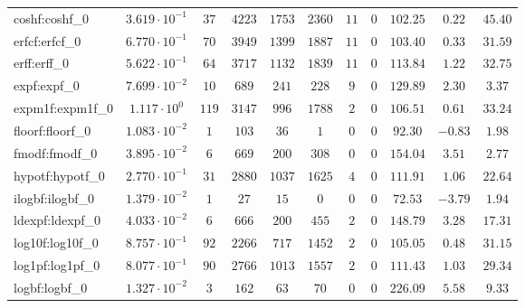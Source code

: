 \begin{tabular}{|l|c|c|c|c|c|c|c|c|c|c|}
coshf:coshf\_0               & $ 3.619 \cdot 10^{-1} $ & $ 37     $ & $ 4223  $ & $ 1753  $ & $ 2360  $ & $ 11  $ & $ 0 $ & $ 102.25      $ & $ 0.22    $ & $ 45.40   $ \\
erfcf:erfcf\_0               & $ 6.770 \cdot 10^{-1} $ & $ 70     $ & $ 3949  $ & $ 1399  $ & $ 1887  $ & $ 11  $ & $ 0 $ & $ 103.40      $ & $ 0.33    $ & $ 31.59   $ \\
erff:erff\_0                 & $ 5.622 \cdot 10^{-1} $ & $ 64     $ & $ 3717  $ & $ 1132  $ & $ 1839  $ & $ 11  $ & $ 0 $ & $ 113.84      $ & $ 1.22    $ & $ 32.75   $ \\
expf:expf\_0                 & $ 7.699 \cdot 10^{-2} $ & $ 10     $ & $ 689   $ & $ 241   $ & $ 228   $ & $ 9   $ & $ 0 $ & $ 129.89      $ & $ 2.30    $ & $ 3.37    $ \\
expm1f:expm1f\_0             & $ 1.117 \cdot 10^{0}  $ & $ 119    $ & $ 3147  $ & $ 996   $ & $ 1788  $ & $ 2   $ & $ 0 $ & $ 106.51      $ & $ 0.61    $ & $ 33.24   $ \\
floorf:floorf\_0             & $ 1.083 \cdot 10^{-2} $ & $ 1      $ & $ 103   $ & $ 36    $ & $ 1     $ & $ 0   $ & $ 0 $ & $ 92.30       $ & $ -0.83   $ & $ 1.98    $ \\
fmodf:fmodf\_0               & $ 3.895 \cdot 10^{-2} $ & $ 6      $ & $ 669   $ & $ 200   $ & $ 308   $ & $ 0   $ & $ 0 $ & $ 154.04      $ & $ 3.51    $ & $ 2.77    $ \\
hypotf:hypotf\_0             & $ 2.770 \cdot 10^{-1} $ & $ 31     $ & $ 2880  $ & $ 1037  $ & $ 1625  $ & $ 4   $ & $ 0 $ & $ 111.91      $ & $ 1.06    $ & $ 22.64   $ \\
ilogbf:ilogbf\_0             & $ 1.379 \cdot 10^{-2} $ & $ 1      $ & $ 27    $ & $ 15    $ & $ 0     $ & $ 0   $ & $ 0 $ & $ 72.53       $ & $ -3.79   $ & $ 1.94    $ \\
ldexpf:ldexpf\_0             & $ 4.033 \cdot 10^{-2} $ & $ 6      $ & $ 666   $ & $ 200   $ & $ 455   $ & $ 2   $ & $ 0 $ & $ 148.79      $ & $ 3.28    $ & $ 17.31   $ \\
log10f:log10f\_0             & $ 8.757 \cdot 10^{-1} $ & $ 92     $ & $ 2266  $ & $ 717   $ & $ 1452  $ & $ 2   $ & $ 0 $ & $ 105.05      $ & $ 0.48    $ & $ 31.15   $ \\
log1pf:log1pf\_0             & $ 8.077 \cdot 10^{-1} $ & $ 90     $ & $ 2766  $ & $ 1013  $ & $ 1557  $ & $ 2   $ & $ 0 $ & $ 111.43      $ & $ 1.03    $ & $ 29.34   $ \\
logbf:logbf\_0               & $ 1.327 \cdot 10^{-2} $ & $ 3      $ & $ 162   $ & $ 63    $ & $ 70    $ & $ 0   $ & $ 0 $ & $ 226.09      $ & $ 5.58    $ & $ 9.33    $ \\

\end{tabular}
